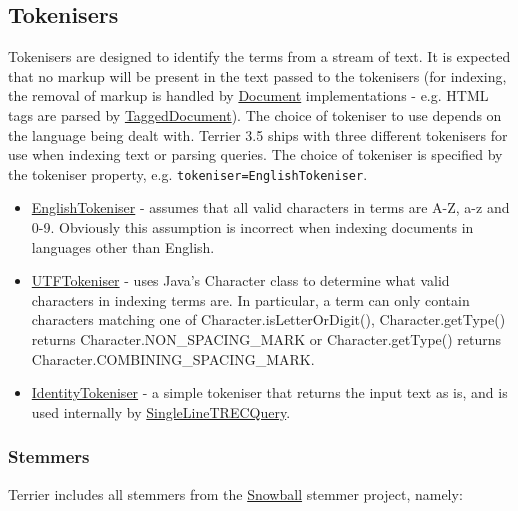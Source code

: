 \subsection{Tokenisers}\label{tokenisers}

Tokenisers are designed to identify the terms from a stream of text. It
is expected that no markup will be present in the text passed to the
tokenisers (for indexing, the removal of markup is handled by
\href{javadoc/org/terrier/indexing/Document.html}{Document}
implementations - e.g. HTML tags are parsed by
\href{javadoc/org/terrier/indexing/TaggedDocument.html}{TaggedDocument}).
The choice of tokeniser to use depends on the language being dealt with.
Terrier 3.5 ships with three different tokenisers for use when indexing
text or parsing queries. The choice of tokeniser is specified by the
tokeniser property, e.g. \texttt{tokeniser=EnglishTokeniser}.

\begin{itemize}
\tightlist
\item
  \href{javadoc/org/terrier/indexing/tokenisation/EnglishTokeniser.html}{EnglishTokeniser}
  - assumes that all valid characters in terms are A-Z, a-z and 0-9.
  Obviously this assumption is incorrect when indexing documents in
  languages other than English.
\item
  \href{javadoc/org/terrier/indexing/tokenisation/UTFTokeniser.html}{UTFTokeniser}
  - uses Java's Character class to determine what valid characters in
  indexing terms are. In particular, a term can only contain characters
  matching one of Character.isLetterOrDigit(), Character.getType()
  returns Character.NON\_SPACING\_MARK or Character.getType() returns
  Character.COMBINING\_SPACING\_MARK.
\item
  \href{javadoc/org/terrier/indexing/tokenisation/IdentityTokeniser.html}{IdentityTokeniser}
  - a simple tokeniser that returns the input text as is, and is used
  internally by
  \href{javadoc/org/terrier/structures/SingleLineTRECQuery.html}{SingleLineTRECQuery}.
\end{itemize}

\subsubsection{Stemmers}\label{stemmers}

Terrier includes all stemmers from the
\href{http://snowball.tartarus.org/}{Snowball} stemmer project, namely:

